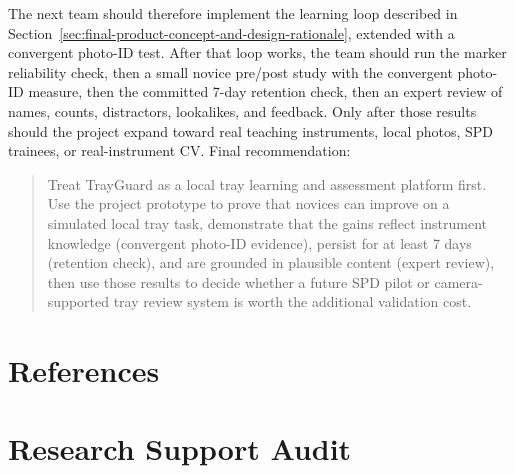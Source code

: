 \documentclass[10pt,a4paper]{article}
\begin{document}
The next team should therefore implement the learning loop described in Section~\ref{sec:final-product-concept-and-design-rationale}, extended with a convergent photo-ID test. After that loop works, the team should run the marker reliability check, then a
small novice pre/post study with the convergent photo-ID measure, then the
committed 7-day retention check, then an expert review of names, counts,
distractors, lookalikes, and feedback. Only after those results should the
project expand toward real teaching instruments, local photos, SPD trainees, or
real-instrument CV.
Final recommendation:
\begin{quote}
Treat TrayGuard as a local tray learning and assessment platform first. Use
the project prototype to prove that novices can improve on a simulated local tray
task, demonstrate that the gains reflect instrument knowledge (convergent
photo-ID evidence), persist for at least 7 days (retention check), and are
grounded in plausible content (expert review), then use those results to decide
whether a future SPD pilot or camera-supported tray review system is worth the
additional validation cost.
\end{quote}



%

\section{References}
\label{sec:references}
{\small
\raggedright

}

\appendix
\section{Research Support Audit}
\label{sec:appendix-a-research-support-audit}
\end{document}
